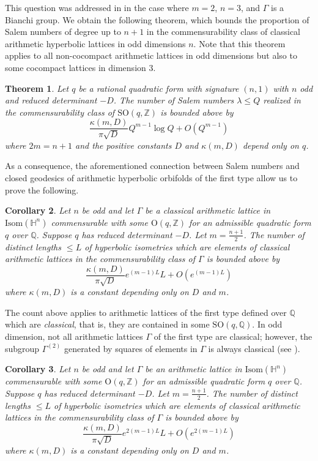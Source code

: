 \documentclass[12pt]{amsart}
\newcommand{\Or}{\mathrm{O}}
\newcommand{\SO}{\mathrm{SO}}
\renewcommand{\H}{\mathbb{H}}
\newcommand{\Q}{\mathbb{Q}}
\newcommand{\Z}{\mathbb{Z}}
\theoremstyle{plain}
\newtheorem{mainthm}{Theorem}
\newtheorem{maincor}[mainthm]{Corollary}
\begin{document}
This question was addressed in \cite{BLMT22} in the case where $m=2$, $n=3$, and $\Gamma$ is a Bianchi group. We obtain the following theorem, which bounds the proportion of Salem numbers of degree up to $n+1$ in the commensurability class of classical arithmetic hyperbolic lattices in odd dimensions $n$. Note that this theorem applies to all non-cocompact arithmetic lattices in odd dimensions but also to some cocompact lattices in dimension 3.


\begin{mainthm} \label{ThmSalemProportion}
 Let $q$ be a rational quadratic form with signature $(n,1)$ with $n$ odd and reduced determinant $-D$. The number of Salem numbers $\lambda\leq Q$ realized in the commensurability class of $\SO(q,\Z)$ is bounded above by 
    \[ \frac{\kappa(m,D)}{\pi\sqrt{D}}Q^{m-1}\log Q + O(Q^{m-1})
    \]
    where $2m=n+1$ and the positive constants $D$ and $\kappa(m,D)$ depend only on $q$.
\end{mainthm}

As a consequence, the aforementioned connection between Salem numbers and closed geodesics of arithmetic hyperbolic orbifolds of the first type allow us to prove the following.

\begin{maincor} \label{ThmLengths}
Let $n$ be odd and let $\Gamma$ be a classical arithmetic lattice in $\mathrm{Isom}(\H^n)$ commensurable with some $\Or(q,\Z)$ for an admissible quadratic form $q$ over $\Q$. Suppose $q$ has reduced determinant $-D$. Let $m=\frac{n+1}{2}$. The number of distinct lengths $\leq L$ of hyperbolic isometries which are elements of classical arithmetic lattices in the commensurability class of $\Gamma$ is bounded above by
\[
    \frac{\kappa(m,D)}{\pi\sqrt{D}}e^{(m-1)L}L + O(e^{(m-1)L})
\]
where $\kappa(m,D)$ is a constant depending only on $D$ and $m$.
\end{maincor}

The count above applies to arithmetic lattices of the first type defined over $\Q$ which are \emph{classical}, that is, they are contained in some $\SO(q,\Q)$. In odd dimension, not all arithmetic lattices $\Gamma$ of the first type are classical; however, the subgroup $\Gamma^{(2)}$ generated by squares of elements in $\Gamma$ is always classical (see \cite[Lemma 4.5]{EmeryRatcliffeTschantz}).

\begin{maincor} \label{ThmLengthsnotclassical}
Let $n$ be odd and let $\Gamma$ be an arithmetic lattice in $\mathrm{Isom}(\H^n)$ commensurable with some $\Or(q,\Z)$ for an admissible quadratic form $q$ over $\Q$. Suppose $q$ has reduced determinant $-D$. Let $m=\frac{n+1}{2}$. The number of distinct lengths $\leq L$ of hyperbolic isometries which are elements of classical arithmetic lattices in the commensurability class of $\Gamma$ is bounded above by
\[
    \frac{\kappa(m,D)}{\pi\sqrt{D}}e^{2(m-1)L}L + O(e^{2(m-1)L})
\]
where $\kappa(m,D)$ is a constant depending only on $D$ and $m$.
\end{maincor}
\end{document}
